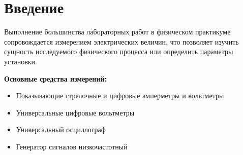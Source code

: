 \documentclass[14pt, a4paper, twoside]{extreport}
\begin{document}
\section{Введение}
Выполнение большинства лабораторных работ в физическом практикуме сопровождается измерением электрических величин, что позволяет изучить сущность исследуемого физического процесса или определить параметры установки.

\textbf{Основные средства измерений:}
\begin{itemize}
  \item Показывающие стрелочные и цифровые амперметры и вольтметры
  \item Универсальные цифровые вольтметры
  \item Универсальный осциллограф
  \item Генератор сигналов низкочастотный
\end{itemize}
\end{document}

